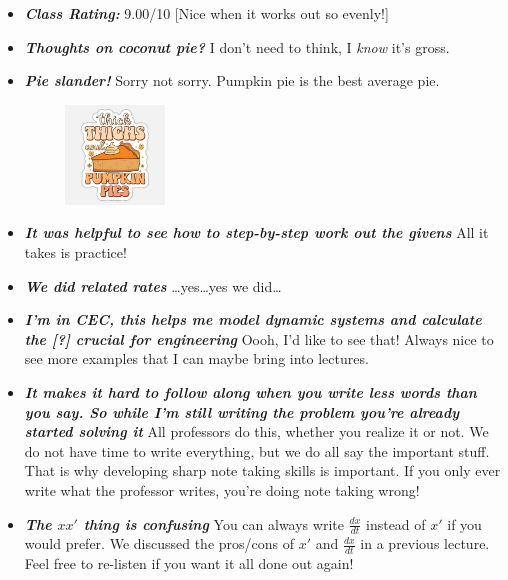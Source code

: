 \documentclass[11pt,letterpaper]{article}
\begin{document}
\begin{itemize}
\item {\bfseries\itshape Class Rating:} 9.00/10 [Nice when it works out so evenly!]

\item {\bfseries\itshape Thoughts on coconut pie?} I don't need to think, I \textit{know} it's gross. 

\item {\bfseries\itshape Pie slander!} Sorry not sorry. Pumpkin pie is the best average pie.
	\begin{figure}[H]
	\centering
	\includegraphics[width=0.25\textwidth]{images/pie.jpg}
	\end{figure}

\item {\bfseries\itshape It was helpful to see how to step-by-step work out the givens} All it takes is practice!

\item {\bfseries\itshape We did related rates} \dots yes\dots yes we did\dots

\item {\bfseries\itshape I'm in CEC, this helps me model dynamic systems and calculate the [?] crucial for engineering} Oooh, I'd like to see that! Always nice to see more examples that I can maybe bring into lectures.

\item {\bfseries\itshape It makes it hard to follow along when you write less words than you say. So while I'm still writing the problem you're already started solving it} All professors do this, whether you realize it or not. We do not have time to write everything, but we do all say the important stuff. That is why developing sharp note taking skills is important. If you only ever write what the professor writes, you're doing note taking wrong!

\item {\bfseries\itshape The $xx'$ thing is confusing} You can always write $\frac{dx}{dt}$ instead of $x'$ if you would prefer. We discussed the pros/cons of $x'$ and $\frac{dx}{dt}$ in a previous lecture. Feel free to re-listen if you want it all done out again!
\end{itemize}
\end{document}
